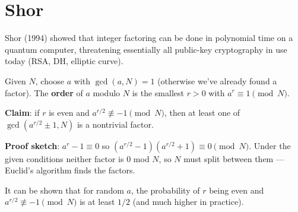 \documentclass[oneside]{academica}
\begin{document}
\section{Shor}

Shor (1994) showed that integer factoring can be done in polynomial time on a quantum computer, threatening essentially all public-key cryptography in use today (RSA, DH, elliptic curve).

Given $N$, choose $a$ with $\gcd(a,N)=1$ (otherwise we've already found a factor).
The \textbf{order} of $a$ modulo $N$ is the smallest $r>0$ with $a^r\equiv1\pmod N$.

\textbf{Claim}: if $r$ is even and $a^{r/2}\not\equiv-1\pmod N$, then at least one of $\gcd(a^{r/2}\pm1,N)$ is a nontrivial factor.

\textbf{Proof sketch}: $a^r-1\equiv0$ so $(a^{r/2}-1)(a^{r/2}+1)\equiv0\pmod N$. Under the given conditions neither factor is 0 mod $N$, so $N$ must split between them --- Euclid's algorithm finds the factors.

It can be shown that for random $a$, the probability of $r$ being even and $a^{r/2}\not\equiv-1\pmod N$ is at least $1/2$ (and much higher in practice).
\end{document}
